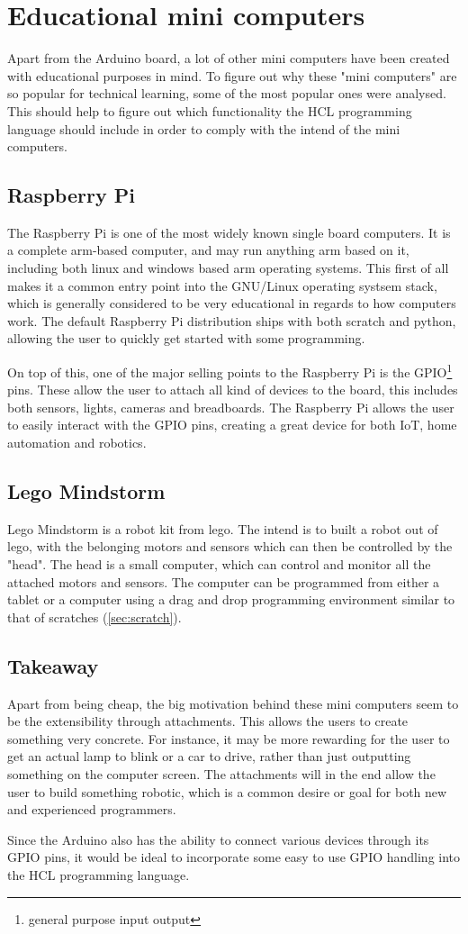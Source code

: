 \section{Educational mini computers}

Apart from the Arduino board, a lot of other mini computers have been created with educational purposes in mind.
To figure out why these "mini computers" are so popular for technical learning, some of the most popular ones were analysed.
This should help to figure out which functionality the HCL programming language should include in order to comply with the intend of the mini computers.

\subsection{Raspberry Pi}
The Raspberry Pi is one of the most widely known single board computers. 
It is a complete arm-based computer, and may run anything arm based on it, including both linux and windows based arm operating systems. 
This first of all makes it a common entry point into the GNU/Linux operating systsem stack, which is generally considered to be very educational in regards to how computers work.
The default Raspberry Pi distribution ships with both scratch and python, allowing the user to quickly get started with some programming.\cite{RaspberryPi}

On top of this, one of the major selling points to the Raspberry Pi is the GPIO\footnote{general purpose input output} pins. 
These allow the user to attach all kind of devices to the board, this includes both sensors, lights, cameras and breadboards. 
The Raspberry Pi allows the user to easily interact with the GPIO pins, creating a great device for both IoT, home automation and robotics.\cite{RaspberryPi}

\subsection{Lego Mindstorm}
Lego Mindstorm is a robot kit from lego. 
The intend is to built a robot out of lego, with the belonging motors and sensors which can then be controlled by the "head". 
The head is a small computer, which can control and monitor all the attached motors and sensors. 
The computer can be programmed from either a tablet or a computer using a drag and drop programming environment similar to that of scratches (\ref{sec:scratch}). \cite{LegoMindstorms}

\subsection{Takeaway}
Apart from being cheap, the big motivation behind these mini computers seem to be the extensibility through attachments. 
This allows the users to create something very concrete. 
For instance, it may be more rewarding for the user to get an actual lamp to blink or a car to drive, rather than just outputting something on the computer screen. 
The attachments will in the end allow the user to build something robotic, which is a common desire or goal for both new and experienced programmers.\cite{EducationalRobotics}

Since the Arduino also has the ability to connect various devices through its GPIO pins, it would be ideal to incorporate some easy to use GPIO handling into the HCL programming language.
